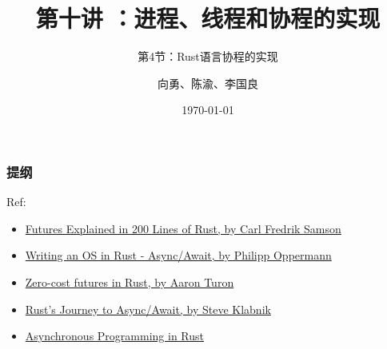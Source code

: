 


\title[第10讲]{第十讲 ：进程、线程和协程的实现} %
\subtitle{第4节：Rust语言协程的实现}
\author{向勇、陈渝、李国良} %
\date{\today} %



\begin{frame}
\titlepage %
\end{frame}

\begin{frame}
\frametitle{提纲} %
\tableofcontents %

\tiny
Ref:
\begin{itemize}
	\item \href{https://cfsamson.github.io/books-futures-explained/}{Futures Explained in 200 Lines of Rust, by Carl Fredrik Samson}
	\item \href{https://os.phil-opp.com/async-await/}{Writing an OS in Rust - Async/Await, by Philipp Oppermann}
	\item \href{https://aturon.github.io/tech/2016/08/11/futures/}{Zero-cost futures in Rust, by Aaron Turon}
	\item \href{https://www.infoq.com/presentations/rust-2019/}{Rust’s Journey to Async/Await, by Steve Klabnik}
	\item \href{https://rust-lang.github.io/async-book/index.html}{Asynchronous Programming in Rust}
\end{itemize}


\end{frame}
